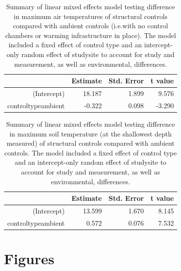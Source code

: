 \documentclass{article}
\begin{document}
\begin{table}[ht]
\centering
\begin{tabular}{rrrr}
  \hline
 & Estimate & Std. Error & t value \\ 
  \hline
(Intercept) & 18.187 & 1.899 & 9.576 \\ 
  controltypeambient & -0.322 & 0.098 & -3.290 \\ 
   \hline
\end{tabular}
\caption{Summary of linear mixed effects model testing difference in maximum air temperatures of structural controls compared with ambient controls (i.e.with no control chambers or warming infrastructure in place). The model included a fixed effect of control type and an intercept-only random effect of studysite to account for study and measurement, as well as environmental, differences.} 
\end{table}
\begin{table}[ht]
\centering
\begin{tabular}{rrrr}
  \hline
 & Estimate & Std. Error & t value \\ 
  \hline
(Intercept) & 13.599 & 1.670 & 8.145 \\ 
  controltypeambient & 0.572 & 0.076 & 7.532 \\ 
   \hline
\end{tabular}
\caption{Summary of linear mixed effects model testing difference in maximum soil temperature (at the shallowest depth measured) of structural controls compared with ambient controls. The model included a fixed effect of control type and an intercept-only random effect of studysite to account for study and measurement, as well as environmental, differences.} 
\end{table}

\clearpage
\section* {Figures}
\end{document}
